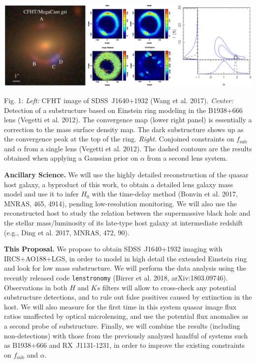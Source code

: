\documentclass[a4paper,11pt]{article}
\begin{document}
\begin{minipage}{\textwidth}
\includegraphics[width=0.95\hsize]{collage.eps}
\end{minipage}
Fig. 1: {\it Left:} CFHT image of SDSS~J1640+1932 (Wang et al. 2017). {\it Center:} Detection of a substructure based on Einstein ring modeling in the B1938+666 lens (Vegetti et al. 2012). The convergence map (lower right panel) is essentially a correction to the mass surface density map. The dark substructure shows up as the convergence peak at the top of the ring. {\it Right}. Conjoined constraints on $f_\mathrm{sub}$ and $\alpha$ from a single lens (Vegetti et al. 2012). The dashed contours are the results obtained when applying a Gaussian prior on $\alpha$ from a second lens system.

{\bf Ancillary Science.} We will use the highly detailed reconstruction of the quasar host galaxy, a byproduct of this work, to obtain a detailed lens galaxy mass model and use it to infer $H_0$ with the time-delay method (Bonvin et al. 2017, MNRAS, 465, 4914), pending low-resolution monitoring. We will also use the reconstructed host  to study the relation between the supermassive black hole and the stellar mass/luminosity of its late-type host galaxy at intermediate redshift (e.g., Ding et al. 2017, MNRAS, 472, 90). 

{\bf This Proposal.} We propose to obtain SDSS~J1640+1932 imaging with IRCS+AO188+LGS, in order to model in high detail the extended Einstein ring and look for low mass substructure. We will perform the data analysis using the recently released code \texttt{lenstronomy} (Birrer et al. 2018, arXiv:1803.09746). Observations in both $H$ and $Ks$ filters will allow to cross-check any potential substructure detections, and to rule out false positives caused by extinction in the host. We will also measure for the first time in this system quasar image flux ratios unaffected by optical microlensing, and use the potential flux anomalies as a second probe of substructure. Finally, we will combine the results (including non-detections) with those from the previously analyzed handful of systems such as B1938+666 and RX~J1131-1231, in order to improve the existing constraints on $f_\mathrm{sub}$ and $\alpha$.
\end{document}
